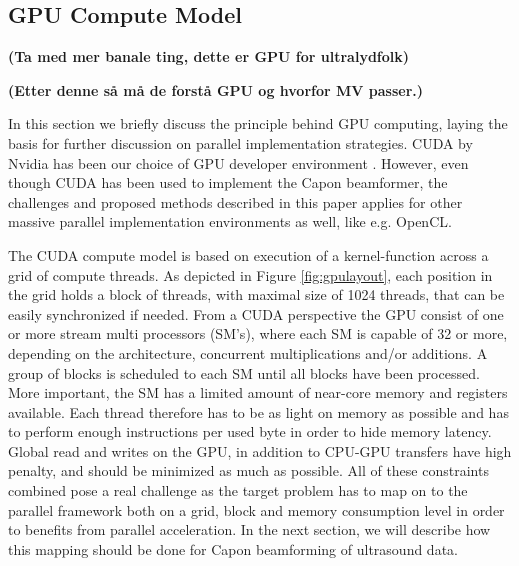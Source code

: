 \documentclass[journal]{IEEEtran}
\begin{document}
\subsection{GPU Compute Model}

\textbf{(Ta med mer banale ting, dette er GPU for ultralydfolk)}

\textbf{(Etter denne så må de forstå GPU og hvorfor MV passer.)}

In this section we briefly discuss the principle behind GPU computing, laying the basis for further discussion on parallel implementation strategies. CUDA by Nvidia has been our choice of GPU developer environment \cite{Nvidia2011}. However, even though CUDA has been used to implement the Capon beamformer, the challenges and proposed methods described in this paper applies for other massive parallel implementation environments as well, like e.g. OpenCL. 

The CUDA compute model is based on execution of a kernel-function across a grid of compute threads. As depicted in Figure \ref{fig:gpulayout}, each position in the grid holds a block of threads, with maximal size of 1024 threads, that can be easily synchronized if needed. 
From a CUDA perspective the GPU consist of one or more stream multi processors (SM's), where each SM is capable of 32 or more, depending on the architecture, concurrent multiplications and/or additions. A group of blocks is scheduled to each SM until all blocks have been processed. More important, the SM has a limited amount of near-core memory and registers available. Each thread therefore has to be as light on memory as possible and has to perform enough instructions per used byte in order to hide memory latency. Global read and writes on the GPU, in addition to CPU-GPU transfers have high penalty, and should be minimized as much as possible. All of these constraints combined pose a real challenge as the target problem has to map on to the parallel framework both on a grid, block and memory consumption level in order to benefits from parallel acceleration. In the next section, we will describe how this mapping should be done for Capon beamforming of ultrasound data.    

\end{document}
